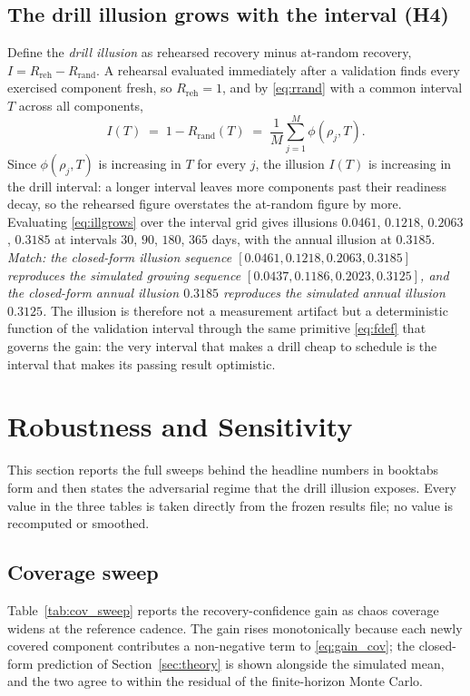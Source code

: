 \documentclass[journal]{IEEEtran}
\begin{document}
\subsection{The drill illusion grows with the interval (H4)}
Define the \emph{drill illusion} as rehearsed recovery minus at-random recovery, $I = R_{\mathrm{reh}}
- R_{\mathrm{rand}}$. A rehearsal evaluated immediately after a validation finds every exercised
component fresh, so $R_{\mathrm{reh}} = 1$, and by \eqref{eq:rrand} with a common interval $T$ across
all components,
\begin{equation}
\label{eq:illgrows}
I(T) \;=\; 1 - R_{\mathrm{rand}}(T) \;=\; \frac{1}{M}\!\sum_{j=1}^{M} \phi(\rho_j, T).
\end{equation}
Since $\phi(\rho_j, T)$ is increasing in $T$ for every $j$, the illusion $I(T)$ is increasing in the
drill interval: a longer interval leaves more components past their readiness decay, so the rehearsed
figure overstates the at-random figure by more. Evaluating \eqref{eq:illgrows} over the interval grid
gives illusions $0.0461$, $0.1218$, $0.2063$, $0.3185$ at intervals $30$, $90$, $180$, $365$ days,
with the annual illusion at $0.3185$. \emph{Match: the closed-form illusion sequence $[0.0461, 0.1218,
0.2063, 0.3185]$ reproduces the simulated growing sequence $[0.0437, 0.1186, 0.2023, 0.3125]$, and the
closed-form annual illusion $0.3185$ reproduces the simulated annual illusion $0.3125$.} The illusion
is therefore not a measurement artifact but a deterministic function of the validation interval through
the same primitive \eqref{eq:fdef} that governs the gain: the very interval that makes a drill cheap to
schedule is the interval that makes its passing result optimistic.

\section{Robustness and Sensitivity}
\label{sec:robustness}
This section reports the full sweeps behind the headline numbers in booktabs form and then states the
adversarial regime that the drill illusion exposes. Every value in the three tables is taken directly
from the frozen results file; no value is recomputed or smoothed.

\subsection{Coverage sweep}
Table~\ref{tab:cov_sweep} reports the recovery-confidence gain as chaos coverage widens at the
reference cadence. The gain rises monotonically because each newly covered component contributes a
non-negative term to \eqref{eq:gain_cov}; the closed-form prediction of Section~\ref{sec:theory} is
shown alongside the simulated mean, and the two agree to within the residual of the finite-horizon
Monte Carlo.
\end{document}
